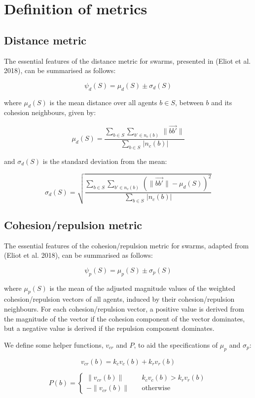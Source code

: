 \documentclass{article}
\begin{document}
\section{Definition of metrics}
\subsection{Distance metric}
The essential features of the distance metric for swarms, presented in (Eliot et al. 2018), can be summarised as follows:

$$
\psi_d(S) = \mu_d(S) \pm \sigma_d(S)
$$

where $\mu_d(S)$ is the mean distance over all agents $b \in S$, between $b$ and its cohesion neighbours, given by:

$$
\mu_d(S) = \frac{\sum_{b \in S} \sum_{b' \in n_c(b)}\, \lVert\vec{b b'}\rVert}{\sum_{b \in S}\,\big\lvert n_c(b)\big\rvert}
$$

and $\sigma_d(S)$ is the standard deviation from the mean:

$$
\sigma_d(S) = \sqrt{\frac{\sum_{b \in S} \sum_{b' \in n_c(b)}\, \left(\lVert\vec{b b'}\rVert - \mu_d(S)\right)^2}{\sum_{b \in S}\,\big\lvert n_c(b)\big\rvert}}
$$
\subsection{Cohesion/repulsion metric}
The essential features of the cohesion/repulsion metric for swarms, adapted from (Eliot et al. 2018), can be summarised as follows:

$$
\psi_p(S) = \mu_p(S) \pm \sigma_p(S)
$$

where $\mu_p(S)$ is the mean of the adjusted magnitude values of the weighted cohesion/repulsion vectors of all agents, induced by their cohesion/repulsion neighbours. For each cohesion/repulsion vector, a positive value is derived from the magnitude of the vector if the cohesion component of the
vector dominates, but a negative value is derived if the repulsion component dominates.

We define some helper functions, $v_{cr}$ and $P$, to 
aid the specifications of $\mu_p$ and $\sigma_p$:

$$
v_{cr}(b) = k_c v_c(b) + k_r v_r(b)
$$

$$
P(b) = \left\{ \begin{array}{ll}
                \lVert v_{cr}(b) \rVert & \quad k_c v_c(b) > k_r v_r(b) \\
                -\lVert v_{cr}(b) \rVert & \quad \mathrm{otherwise}
              \end{array}
       \right.
$$
\end{document}
